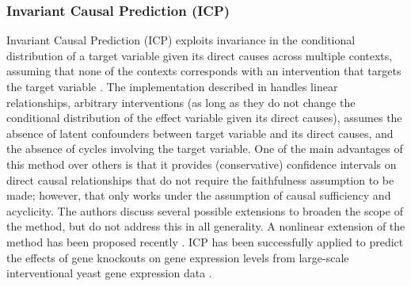\documentclass[twoside,11pt]{article}
\begin{document}
\subsubsection{Invariant Causal Prediction (ICP)}
Invariant Causal Prediction (ICP) exploits invariance in the
conditional distribution of a target variable given its direct causes across multiple contexts,
assuming that none of the contexts corresponds with an intervention that targets the target
variable \citep{ICP2016}.
The implementation described in \citet{ICP2016} handles linear relationships, arbitrary interventions
(as long as they do not change the conditional distribution of the effect variable given its direct
causes), assumes the absence of latent confounders between target variable and its direct causes, and
the absence of cycles involving the target variable.
One of the main advantages of this method over others is that it provides (conservative) confidence intervals on direct causal relationships that do not require the faithfulness assumption to be made; however, that only works under
the assumption of causal sufficiency and acyclicity.
The authors discuss several possible extensions to broaden the scope of the method, but do not address this in all generality. 
A nonlinear extension of the method has been proposed recently \citep{Heinze-Deml++2017}.
ICP has been successfully applied to predict the effects of gene knockouts on gene expression levels \citet{Meinshausen++_PNAS_16} from large-scale interventional yeast gene expression data \citet{Kemmeren2014}.
\end{document}
